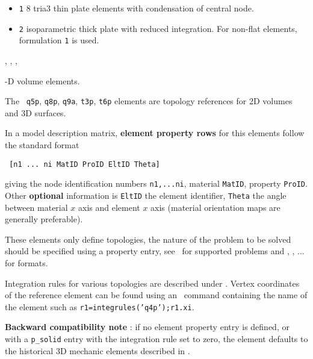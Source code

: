 \begin{itemize}
 \item {\tt 1} 8 tria3 thin plate elements with condensation of central node.
 \item {\tt 2} isoparametric thick plate with reduced integration. For non-flat elements, formulation {\tt 1} is used.
\end{itemize}



\melastic, \pshell, \femk, \feplot 


-D volume elements. 


The \qfourp\, {\tt q5p}, {\tt q8p}, {\tt q9a}, {\tt t3p}, {\tt t6p} elements are topology references for 2D volumes and 3D surfaces.


In a model description matrix, {\bf element property rows} for this  elements follow the standard format

\begin{verbatim}
 [n1 ... ni MatID ProID EltID Theta] 
\end{verbatim}


giving the node identification numbers {\tt n1,...ni}, material {\tt MatID}, property {\tt ProID}. Other {\bf optional} information is {\tt EltID} the element identifier, {\tt Theta} the angle between material $x$ axis and element $x$ axis (material orientation maps are generally preferable).


These elements only define topologies, the nature of the problem to be solved should be specified using a property entry, see~ for supported problems and  \psolid, \pheat, ... for formats. 


Integration rules for various topologies are described under \integrules. Vertex coordinates of the reference element can be found using an \integrules\ command containing the name of the element such as {\tt r1=integrules('q4p');r1.xi}.


{\bf Backward compatibility note} : if no element property entry is defined, or with a {\tt p\_solid} entry with the integration rule set to zero, the element defaults to the historical 3D mechanic elements described in . 



